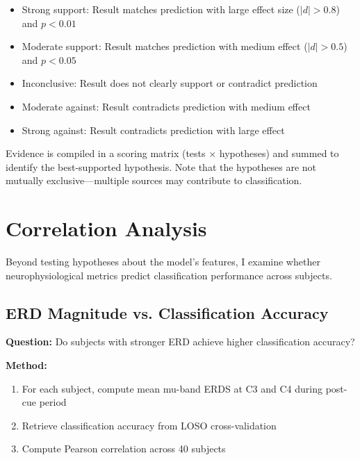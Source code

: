 \begin{itemize}
    \item[\textbf{++}] Strong support: Result matches prediction with large effect size ($|d| > 0.8$) and $p < 0.01$
    \item[\textbf{+}] Moderate support: Result matches prediction with medium effect ($|d| > 0.5$) and $p < 0.05$
    \item[\textbf{0}] Inconclusive: Result does not clearly support or contradict prediction
    \item[\textbf{--}] Moderate against: Result contradicts prediction with medium effect
    \item[\textbf{-{}-}] Strong against: Result contradicts prediction with large effect
\end{itemize}

Evidence is compiled in a scoring matrix (tests $\times$ hypotheses) and summed to identify the best-supported hypothesis. Note that the hypotheses are not mutually exclusive—multiple sources may contribute to classification.


\section{Correlation Analysis}
\label{sec:methods_correlation}

Beyond testing hypotheses about the model's features, I examine whether neurophysiological metrics predict classification performance across subjects.


\subsection{ERD Magnitude vs. Classification Accuracy}
\label{subsec:methods_erd_accuracy}

\textbf{Question:} Do subjects with stronger ERD achieve higher classification accuracy?

\textbf{Method:}
\begin{enumerate}
    \item For each subject, compute mean mu-band ERDS at C3 and C4 during post-cue period
    \item Retrieve classification accuracy from LOSO cross-validation
    \item Compute Pearson correlation across 40 subjects
\end{enumerate}

